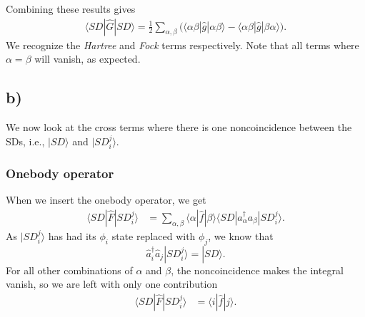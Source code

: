 \documentclass[a4paper, 11pt, notitlepage, english]{article}
\newcommand{\ket}[1]{|#1 \rangle}
\newcommand{\op}[1]{\hat{#1}}
\newcommand{\braopket}[3]{\langle #1 | {#2} | #3 \rangle}
\begin{document}
Combining these results gives
\begin{align*}
\braopket{SD}{\op{G}}{SD}
=  \frac{1}{2}\sum_{\alpha,\beta} \bigg(\braopket{\alpha\beta}{\op{g}}{\alpha\beta} - \braopket{\alpha\beta}{\op{g}}{\beta\alpha}\bigg).
\end{align*}
We recognize the \emph{Hartree} and \emph{Fock} terms respectively. Note that all terms where $\alpha=\beta$ will vanish, as expected.

\subsection*{b)}
We now look at the cross terms where there is one noncoincidence between the SDs, i.e., $\ket{SD}$ and $\ket{SD_i^j}$. 

\subsubsection*{Onebody operator}
When we insert the onebody operator, we get
\begin{align*}
\braopket{SD}{\op{F}}{SD_i^j} 
&= \sum_{\alpha, \beta} \braopket{\alpha}{\op{f}}{\beta}\braopket{SD}{a_\alpha^\dag a_\beta}{SD_i^j}.
\end{align*}
As $\ket{SD_i^j}$ has had its $\phi_i$ state replaced with $\phi_j$, we know that
$$\op{a}_i^\dag \op{a}_j\ket{SD_i^j} = \ket{SD}.$$
For all other combinations of $\alpha$ and $\beta$, the noncoincidence makes the integral vanish, so we are left with only one contribution
\begin{align*}
\braopket{SD}{\op{F}}{SD_i^j} 
&= \braopket{i}{\op{f}}{j}.
\end{align*}
\end{document}
